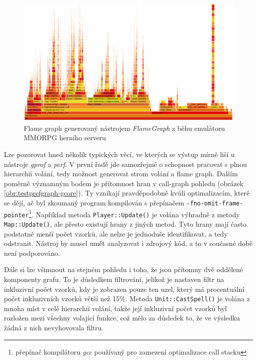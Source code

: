 \documentclass[czech,BP]{thesiskiv}
\begin{document}
\begin{figure}
    \centering
    \includegraphics[interpolate,width=1.0\textwidth]{img/test-gcore-brendan-flame.png}
    \caption{Flame graph generovaný nástrojem \emph{FlameGraph} z běhu emulátoru MMORPG herního serveru}
    \label{obr:testprefflamegregg-gcore}
\end{figure}

Lze pozorovat hned několik typických věcí, ve kterých se výstup mírně liší u nástroje \emph{gprof} a \emph{perf}. V první řadě jde samozřejmě o schopnost pracovat s plnou hierarchií volání, tedy možnost generovat strom volání a flame graph. Dalším poměrně významným bodem je přítomnost  hran v call-graph pohledu (obrázek \ref{obr:testprefgraph-gcore}). Ty vznikají pravděpodobně kvůli optimalizacím, které se dějí, ač byl zkoumaný program kompilován s přepínačem \texttt{-fno-omit-frame-pointer}\footnote{přepínač kompilátoru \emph{gcc} používaný pro zamezení optimalizace call stacku}. Například metoda \texttt{Player::Update()} je volána výhradně z metody \texttt{Map::Update()}, ale přesto existují hrany z jiných metod. Tyto hrany mají často podstatně menší počet vzorků, ale nelze je jednoduše identifikovat, a tedy odstranit. Nástroj by musel umět analyzovat i zdrojový kód, a to v současné době není podporováno.

Dále si lze všimnout na stejném pohledu i toho, že jsou přítomny dvě oddělené komponenty grafu. To je důsledkem filtrování, jelikož je nastaven filtr na inkluzivní počet vzorků, kdy je zobrazen pouze ten uzel, který má procentuální počet inkluzivních vzorků větší než 15\%. Metoda \texttt{Unit::CastSpell()} je volána z mnoha míst v celé hierarchii volání, takže její inkluzivní počet vzorků byl rozložen mezi všechny volající funkce, což mělo za důsledek to, že ve výsledku žádná z nich nevyhovovala filtru.
\end{document}
